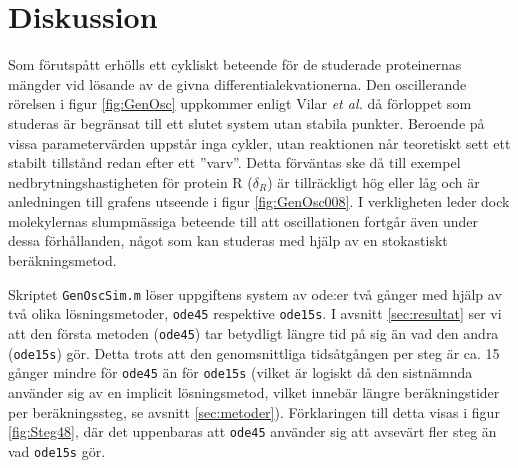 \section{Diskussion}
Som förutspått erhölls ett cykliskt beteende för de studerade proteinernas mängder vid lösande av de givna differentialekvationerna. Den oscillerande rörelsen i figur \ref{fig:GenOsc} uppkommer enligt Vilar \emph{et al.} \cite{ref:rapport} då förloppet som studeras är begränsat till ett slutet system utan stabila punkter. Beroende på vissa parametervärden uppstår inga cykler, utan reaktionen når teoretiskt sett ett stabilt tillstånd redan efter ett ''varv''. Detta förväntas ske då till exempel nedbrytningshastigheten för protein R ($\delta_R$) är tillräckligt hög eller låg och är anledningen till grafens utseende i figur \ref{fig:GenOsc008}. I verkligheten leder dock molekylernas slumpmässiga beteende till att oscillationen fortgår även under dessa förhållanden, något som kan studeras med hjälp av en stokastiskt beräkningsmetod. 

Skriptet \texttt{GenOscSim.m} löser uppgiftens system av ode:er två gånger med hjälp av två olika lösningsmetoder, \texttt{ode45} respektive \texttt{ode15s}. I avsnitt \ref{sec:resultat} ser vi att den första metoden (\texttt{ode45}) tar betydligt längre tid på sig än vad den andra (\texttt{ode15s}) gör. Detta trots att den genomsnittliga tidsåtgången per steg är ca. 15 gånger mindre för \texttt{ode45} än för \texttt{ode15s} (vilket är logiskt då den sistnämnda använder sig av en implicit lösningsmetod, vilket innebär längre beräkningstider per beräkningssteg, se avsnitt \ref{sec:metoder}). Förklaringen till detta visas i figur \ref{fig:Steg48}, där det uppenbaras att \texttt{ode45} använder sig att avsevärt fler steg än vad \texttt{ode15s} gör.
